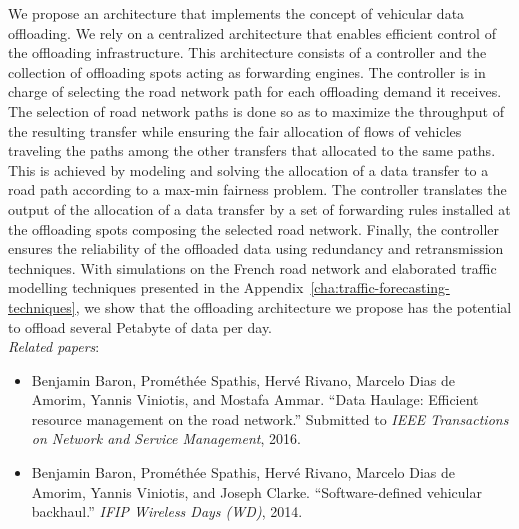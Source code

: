We propose an architecture that implements the concept of vehicular data offloading. We rely on a centralized architecture that enables efficient control of the offloading infrastructure. This architecture consists of a controller and the collection of offloading spots acting as forwarding engines. The controller is in charge of selecting the road network path for each offloading demand it receives. The selection of road network paths is done so as to maximize the throughput of the resulting transfer while ensuring the fair allocation of flows of vehicles traveling the paths among the other transfers that allocated to the same paths. This is achieved by modeling and solving the allocation of a data transfer to a road path according to a max-min fairness problem. 
The controller translates the output of the allocation of a data transfer by a set of forwarding rules installed at the offloading spots composing the selected road network.  Finally, the controller ensures the reliability of the offloaded data using redundancy and retransmission techniques. %
With simulations on the French road network and elaborated traffic modelling techniques presented in the Appendix~\ref{cha:traffic-forecasting-techniques}, we show that the offloading architecture we propose has the potential to offload several Petabyte of data per day.\\[3pt]
\textit{Related papers}:
\begin{itemize}
    \item Benjamin Baron, Prométhée Spathis, Hervé Rivano, Marcelo Dias de Amorim, Yannis Viniotis, and Mostafa Ammar. ``Data Haulage: Efficient resource management on the road network.'' Submitted to \textit{IEEE Transactions on Network and Service Management}, 2016.
    \item Benjamin Baron, Prométhée Spathis, Hervé Rivano, Marcelo Dias de Amorim, Yannis Viniotis, and Joseph Clarke. ``Software-defined vehicular backhaul.'' \textit{IFIP Wireless Days (WD)}, 2014.
\end{itemize}


